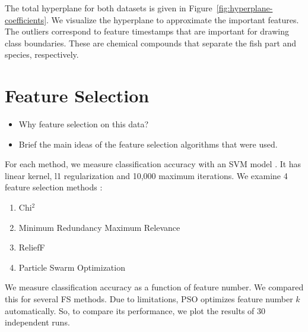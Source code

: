 \documentclass[runningheads]{llncs}
\begin{document}
The total hyperplane for both datasets is given in Figure~\ref{fig:hyperplane-coefficients}.
We visualize the hyperplane to approximate the important features. 
The outliers correspond to feature timestamps that are important for drawing class boundaries. 
These are chemical compounds that separate the fish part and species, respectively. 

\section{Feature Selection}


\begin{itemize}
  \item Why feature selection on this data? 
  \item Brief the main ideas of the feature selection algorithms that were used. 
\end{itemize}

For each method, we measure classification accuracy with an SVM model \cite{sklearn2021feature}.
It has linear kernel, l1 regularization \cite{robnik2003theoretical} and 10,000 maximum iterations.
We examine 4 feature selection methods \cite{chappers2015skfeature}:

\begin{enumerate}
  \item Chi$^2$ \cite{liu1995chi2}
  \item Minimum Redundancy Maximum Relevance \cite{ding2005minimum}
  \item ReliefF \cite{robnik2003theoretical}
  \item Particle Swarm Optimization \cite{kennedy1995particle,kennedy1997discrete}
\end{enumerate}

We measure classification accuracy as a function of feature number.
We compared this for several FS methods.
Due to limitations, PSO optimizes feature number $k$ automatically.
So, to compare its performance, we plot the results of 30 independent runs.
\\\\

\end{document}
